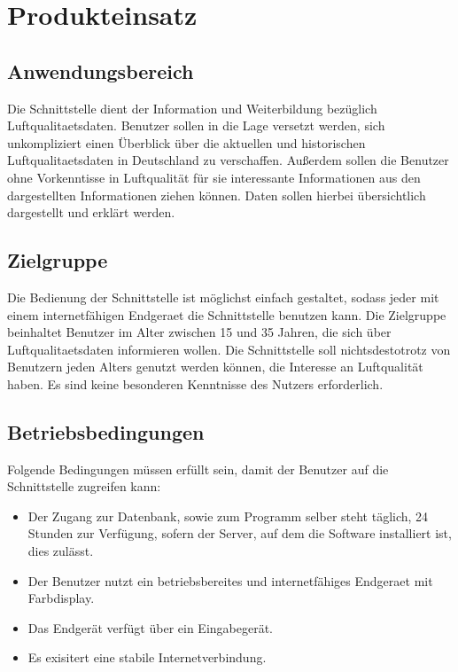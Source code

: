 \section{Produkteinsatz}
\subsection{Anwendungsbereich}
Die Schnittstelle dient der Information und Weiterbildung bezüglich \gls{Luftqualitaetsdaten}. 
Benutzer sollen in die Lage versetzt werden, sich unkompliziert
einen Überblick über die aktuellen und historischen \gls{Luftqualitaetsdaten} in Deutschland zu verschaffen.
Außerdem sollen die Benutzer ohne Vorkenntisse in Luftqualität für sie interessante Informationen aus den dargestellten
Informationen ziehen können. Daten sollen hierbei übersichtlich dargestellt und erklärt werden.
\subsection{Zielgruppe}
Die Bedienung der Schnittstelle ist möglichst einfach gestaltet, sodass jeder mit einem internetfähigen \Gls{Endgeraet} die Schnittstelle benutzen kann.
Die Zielgruppe beinhaltet Benutzer im Alter zwischen 15 und 35 Jahren, die sich über \gls{Luftqualitaetsdaten} informieren wollen. 
Die Schnittstelle soll nichtsdestotrotz von Benutzern jeden Alters genutzt werden können, die Interesse an Luftqualität haben.
Es sind keine besonderen Kenntnisse des Nutzers erforderlich.
\subsection{Betriebsbedingungen}
Folgende Bedingungen müssen erfüllt sein, damit der Benutzer auf die Schnittstelle zugreifen kann:
\begin{itemize}
    \item Der Zugang zur Datenbank, sowie zum Programm selber steht täglich,
    24 Stunden zur Verfügung, sofern der Server, auf dem die Software installiert ist,
    dies zulässt.
    \item Der Benutzer nutzt ein betriebsbereites und internetfähiges \gls{Endgeraet} mit Farbdisplay.
    \item Das Endgerät verfügt über ein Eingabegerät.
    \item Es exisitert eine stabile Internetverbindung.
\end{itemize}
